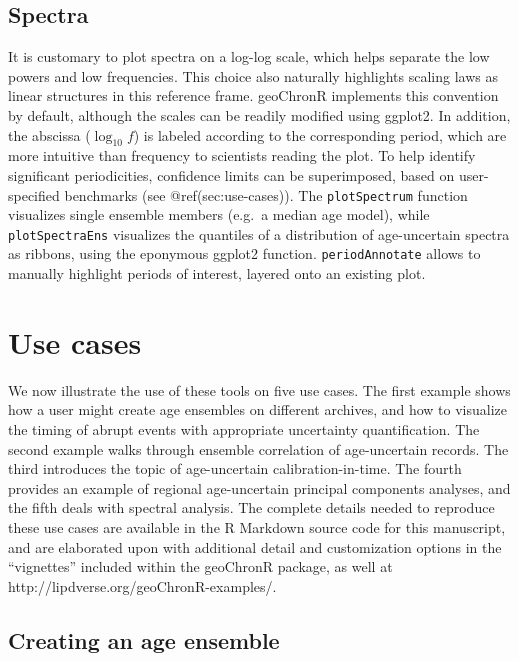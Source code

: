 \documentclass[gchron, manuscript]{copernicus}
\begin{document}
\hypertarget{sec:spec_viz}{%
\subsection{Spectra}\label{sec:spec_viz}}

It is customary to plot spectra on a log-log scale, which helps separate
the low powers and low frequencies. This choice also naturally
highlights scaling laws \citep{lovejoy2013weather, ZhuPNAS2019} as
linear structures in this reference frame. geoChronR implements this
convention by default, although the scales can be readily modified using
ggplot2. In addition, the abscissa (\(\log_{10} f\)) is labeled
according to the corresponding period, which are more intuitive than
frequency to scientists reading the plot. To help identify significant
periodicities, confidence limits can be superimposed, based on
user-specified benchmarks (see @ref(sec:use-cases)). The
\texttt{plotSpectrum} function visualizes single ensemble members
(e.g.~a median age model), while \texttt{plotSpectraEns} visualizes the
quantiles of a distribution of age-uncertain spectra as ribbons, using
the eponymous ggplot2 function. \texttt{periodAnnotate} allows to
manually highlight periods of interest, layered onto an existing plot.

\hypertarget{sec:use-cases}{%
\section{Use cases}\label{sec:use-cases}}

We now illustrate the use of these tools on five use cases. The first
example shows how a user might create age ensembles on different
archives, and how to visualize the timing of abrupt events with
appropriate uncertainty quantification. The second example walks through
ensemble correlation of age-uncertain records. The third introduces the
topic of age-uncertain calibration-in-time. The fourth provides an
example of regional age-uncertain principal components analyses, and the
fifth deals with spectral analysis. The complete details needed to
reproduce these use cases are available in the R Markdown source code
for this manuscript, and are elaborated upon with additional detail and
customization options in the ``vignettes'' included within the geoChronR
package, as well at http://lipdverse.org/geoChronR-examples/.

\hypertarget{sec:create_age}{%
\subsection{Creating an age ensemble}\label{sec:create_age}}
\end{document}
